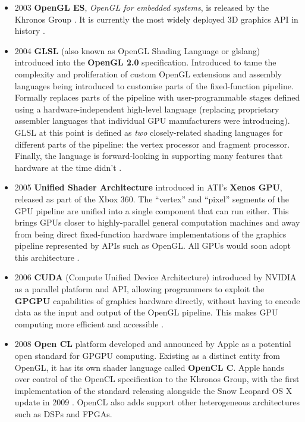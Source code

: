 \documentclass[a4paper,12pt,twoside,openright]{report}
\begin{document}
\begin{itemize}
\item 2003 \textbf{OpenGL ES}, \textit{OpenGL for embedded systems}, is
released by the Khronos Group \cite{OpenGLESRelease}. It is currently the most
widely deployed 3D graphics API in history \cite{OpenGLES}. \\

\item 2004 \textbf{GLSL} (also known as OpenGL Shading Language or glslang)
introduced into the \textbf{OpenGL 2.0} specification. Introduced to tame the
complexity and proliferation of custom OpenGL extensions and assembly languages
being introduced to customise parts of the fixed-function pipeline. Formally
replaces parts of the pipeline with user-programmable stages defined using a
hardware-independent high-level language (replacing proprietary assembler
languages that individual GPU manufacturers were introducing). GLSL at this
point is defined as \textit{two} closely-related shading languages for
different parts of the pipeline: the vertex processor and fragment processor.
Finally, the language is forward-looking in supporting many features that
hardware at the time didn't \cite{GLSL_1_10}. \\

\item 2005 \textbf{Unified Shader Architecture} introduced in ATI's
\textbf{Xenos GPU}, released as part of the Xbox 360. The ``vertex'' and
``pixel'' segments of the GPU pipeline are unified into a single component that
can run either. This brings GPUs closer to highly-parallel general computation
machines and away from being direct fixed-function hardware implementations of
the graphics pipeline represented by APIs such as OpenGL.
\cite{XenosDemystified} All GPUs would soon adopt this architecture
\cite{HistoryOfTheGPU}. \\

\item 2006 \textbf{CUDA} (Compute Unified Device Architecture) introduced by
NVIDIA as a parallel platform and API, allowing programmers to exploit the
\textbf{GPGPU} capabilities of graphics hardware directly, without having to
encode data as the input and output of the OpenGL pipeline. This makes GPU
computing more efficient and accessible \cite{AboutCUDA}. \\

\item 2008 \textbf{Open CL} platform developed and announced by Apple as a
potential open standard for GPGPU computing. Existing as a distinct entity from
OpenGL, it has its own shader language called \textbf{OpenCL C}. Apple hands
over control of the OpenCL specification to the Khronos Group, with the first
implementation of the standard releasing alongside the Snow Leopard OS X update
in 2009 \cite{OpenCL}. OpenCL also adds support other heterogeneous
architectures such as DSPs and FPGAs. \\


\end{itemize}
\end{document}
